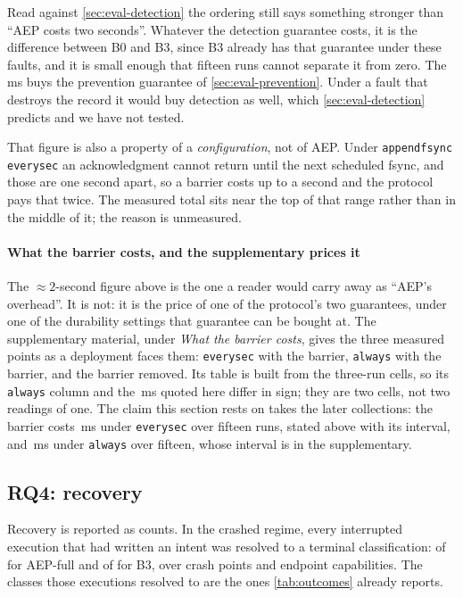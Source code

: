 Read against \cref{sec:eval-detection} the ordering still says something
stronger than ``AEP costs two seconds''. Whatever the detection guarantee
costs, it is the difference between B0 and B3, since B3 already has that
guarantee under these faults, and it is small enough that fifteen runs
cannot separate it from zero. The \BarrierCostFifteen{}\,ms buys the prevention
guarantee of \cref{sec:eval-prevention}. Under a fault that destroys the
record it would buy detection as well, which \cref{sec:eval-detection}
predicts and we have not tested.

That figure is also a property of a \emph{configuration}, not of AEP. Under
\texttt{appendfsync everysec} an acknowledgment cannot return until the next
scheduled fsync, and those are one second apart, so a barrier costs up to a
second and the protocol pays that twice. The measured total sits near the top
of that range rather than in the middle of it; the reason is unmeasured.

\paragraph{What the barrier costs, and the supplementary
prices it} The $\approx 2$-second figure above is the one a reader would
carry away as ``AEP's overhead''. It is not: it is the price of one of the
protocol's two guarantees, under one of the durability settings that
guarantee can be bought at. The supplementary material, under \emph{What the
barrier costs}, gives the three measured points as a deployment faces them:
\texttt{everysec} with the barrier, \texttt{always} with the barrier, and the
barrier removed. Its table is built from the three-run cells, so its
\texttt{always} column and the \BarrierCostAlwaysFortyFive{}\,ms quoted here
differ in sign; they are two cells, not two readings of one. The claim this
section rests on takes the later collections: the barrier costs
\BarrierCostFifteen{}\,ms under \texttt{everysec} over fifteen runs, stated
above with its interval, and \BarrierCostAlwaysFortyFive{}\,ms under
\texttt{always} over fifteen, whose interval is in the supplementary.
\subsection{RQ4: recovery}
\label{sec:eval-rq4}

Recovery is reported as counts. In the crashed regime, every interrupted
execution that had written an intent was resolved to a terminal
classification: \RecoveryAepResolved{} of \RecoveryAepAttempted{} for
AEP-full and \RecoveryBthreeResolved{} of \RecoveryBthreeAttempted{} for B3,
over \RecoveryCrashPoints{} crash points and \RecoveryClasses{} endpoint
capabilities. The classes those executions resolved to are the ones
\cref{tab:outcomes} already reports.

